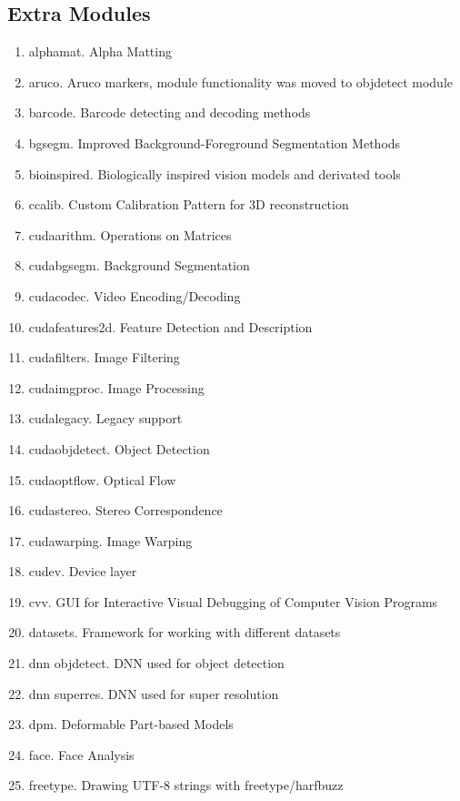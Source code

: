  \subsection{Extra Modules\label{subSection::ExtraModules}}
\begin{enumerate}
     \item alphamat. Alpha Matting 
     \item aruco. Aruco markers, module functionality was moved to objdetect module 
     \item barcode. Barcode detecting and decoding methods 
     \item bgsegm. Improved Background-Foreground Segmentation Methods 
     \item bioinspired. Biologically inspired vision models and derivated tools 
     \item ccalib. Custom Calibration Pattern for 3D reconstruction
     \item cudaarithm. Operations on Matrices
     \item cudabgsegm. Background Segmentation
     \item cudacodec. Video Encoding/Decoding
     \item cudafeatures2d. Feature Detection and Description
     \item cudafilters. Image Filtering
     \item cudaimgproc. Image Processing
     \item cudalegacy. Legacy support
     \item cudaobjdetect. Object Detection
     \item cudaoptflow. Optical Flow
     \item cudastereo. Stereo Correspondence
     \item cudawarping. Image Warping
     \item cudev. Device layer
     \item cvv. GUI for Interactive Visual Debugging of Computer Vision Programs
     \item datasets. Framework for working with different datasets
     \item dnn objdetect. DNN used for object detection
     \item dnn superres. DNN used for super resolution
     \item dpm. Deformable Part-based Models
     \item face. Face Analysis
     \item freetype. Drawing UTF-8 strings with freetype/harfbuzz

\end{enumerate}
